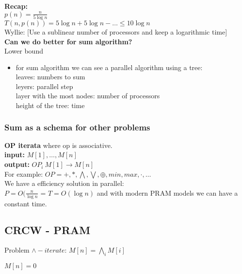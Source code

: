 \textbf{Recap:}\\
$p(n) = \frac{n}{5 \log{n}}$\\
$T(n, p(n)) = 5\log{n} + 5\log{n} - \dots \leq 10\log{n}$\\
Wyllie: [Use a sublinear number of processors and keep a logarithmic time]\\

\textbf{Can we do better for sum algorithm?}\\
Lower bound\\
\begin{itemize}
 \item for sum algorithm we can see a parallel algorithm using a tree:\\
 leaves: numbers to sum\\
 leyers: parallel step\\
 layer with the most nodes: number of processors\\
 height of the tree: time\\
\end{itemize}

\subsubsection{Sum as a schema for other problems}

\textbf{OP iterata} where op is associative.\\
\textbf{input:} $M[1], \dots, M[n]$\\
\textbf{output:} $OP_i \ M[1] \rightarrow M[n]$\\
For example: $OP = +, *, \bigwedge, \bigvee, \oplus, min, max, \cdot, \dots$\\
We have a efficiency solution in parallel:\\
$P = O(\frac{n}{\log{n}}$ = $T = O(\log{n})$ and with modern PRAM models we can have a constant time.\\

\subsection{CRCW - PRAM}

Problem $\wedge-iterate$: $M[n] = \bigwedge_{i}{M[i]}$ 

\begin{algorithm}[H]
 \SetAlgoLined
  {
   {   
   $M[n] = 0$ 
  }
 }
 \caption{$\wedge-iterate$}
\end{algorithm}

